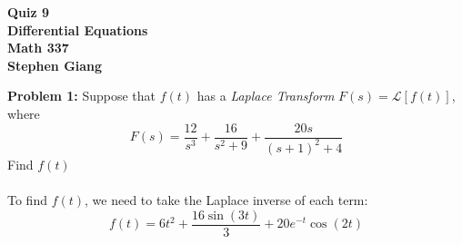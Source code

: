 \documentclass[12pt]{article}
\begin{document}
	
	\begin{center}
		\textbf{Quiz 9} \\
		\textbf{Differential Equations} \\
		\textbf{Math 337} \\
		\textbf{Stephen Giang} \\
	\end{center}

\noindent \textbf{Problem 1: }Suppose that $f(t)$ has a \textit{Laplace Transform} $F(s) = \mathcal{L}[f(t)]$, where 
	$$
	F(s) = \frac{12}{s^3} + \frac{16}{s^2 + 9} + \frac{20s}{(s+1)^2 + 4} 
	$$
Find $f(t)$
\\ \\
To find $f(t)$, we need to take the Laplace inverse of each term:
	$$
	f(t) = 6t^2 + \frac{16\sin(3t)}{3} + 20e^{-t}\cos(2t)
	$$
	
\newpage
\end{document}
